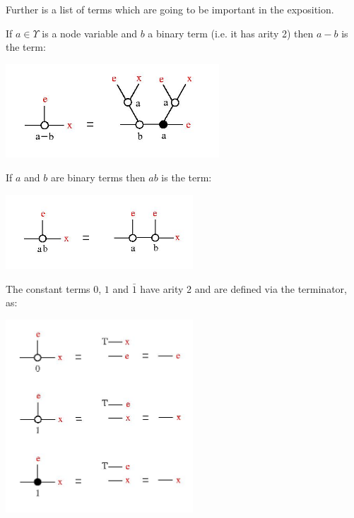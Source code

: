  \vspace{.5cm}



Further is a list of terms which are going to be important in the exposition. 



\begin{definition}
If $a \in \Upsilon$ is a node variable and $b$ a binary term (i.e. it has arity 2) then $\displaystyle a-b$ is the term: 

\vspace{.5cm} 
\centerline{\includegraphics[width=80mm]{jpg/a-b.jpg}} \vspace{.5cm} 


If $a$ and $b$ are binary terms then $\displaystyle ab$ is the term: 

\vspace{.5cm} 
\centerline{\includegraphics[width=70mm]{jpg/ab.jpg}} \vspace{.5cm} 

The constant terms $0$, $1$ and $\displaystyle \bar{1}$ have arity 2 and are defined via the terminator, as: 

\vspace{.5cm} 
\centerline{\includegraphics[width=70mm]{jpg/0.jpg}} \vspace{.5cm} 

\label{ddifprod}
\end{definition}
